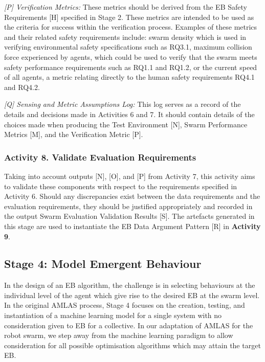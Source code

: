 \documentclass[runningheads]{llncs}
\begin{document}
\emph{[P] Verification Metrics:} These metrics should be derived from the EB Safety Requirements [H] specified in Stage 2. These metrics are intended to be used as the criteria for success within the verification process. Examples of these metrics and their related safety requirements include: swarm density which is used in verifying environmental safety specifications such as RQ3.1, maximum collision force experienced by agents, which could be used to verify that the swarm meets safety performance requirements such as RQ1.1 and RQ1.2, or the current speed of all agents, a metric relating directly to the human safety requirements RQ4.1 and RQ4.2.

\emph{[Q] Sensing and Metric Assumptions Log:} This log serves as a record of the details and decisions made in Activities 6 and 7. It should contain details of the choices made when producing the Test Environment [N], Swarm Performance Metrics [M], and the Verification Metric [P].
\subsubsection*{Activity 8. Validate Evaluation Requirements}

Taking into account outputs [N], [O], and [P] from Activity 7, this activity aims to validate these components with respect to the requirements specified in Activity 6. Should any discrepancies exist between the data requirements and the evaluation requirements, they should be justified appropriately and recorded in the output Swarm Evaluation Validation Results [S]. 
The artefacts generated in this stage are used to instantiate the EB Data Argument Pattern [R] in \textbf{Activity 9}.

\subsection{Stage 4: Model Emergent Behaviour} \label{framework-stage4}
In the design of an EB algorithm, the challenge is in selecting behaviours at the individual level of the agent which give rise to the desired EB at the swarm level. 
In the original AMLAS process, Stage 4 focuses on the creation, testing, and instantiation of a machine learning model for a single system with no consideration given to EB for a collective. 
In our adaptation of AMLAS for the robot swarm,  we step away from the machine learning paradigm to allow consideration for all possible optimisation algorithms which may attain the target EB.
\end{document}
